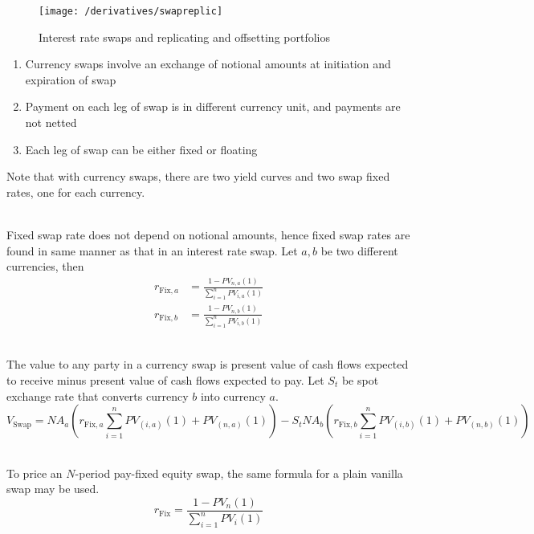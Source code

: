 \begin{figure}[H]
\centering
\texttt{[image: /derivatives/swapreplic]}
\caption{Interest rate swaps and replicating and offsetting portfolios}
\end{figure}

\begin{remark} 
\begin{enumerate}[label=\roman*.]
\setlength{\itemsep}{0pt}
\item Currency swaps involve an exchange of notional amounts at initiation and expiration of swap
\item Payment on each leg of swap is in different currency unit, and payments are not netted
\item Each leg of swap can be either fixed or floating
\end{enumerate}
Note that with currency swaps, there are two yield curves and two swap fixed rates, one for each currency.
\end{remark}

\begin{remark} \\
Fixed swap rate does not depend on notional amounts, hence fixed swap rates are found in same manner as that in an interest rate swap. Let $a,b$ be two different currencies, then
\begin{align}
r_{\text{Fix}, a} &= \frac{1 - PV_{n,a}(1)}{\sum\limits_{i=1}^n PV_{i,a}(1)} \nonumber \\
r_{\text{Fix}, b} &= \frac{1 - PV_{n,b}(1)}{\sum\limits_{i=1}^n PV_{i,b}(1)} \nonumber
\end{align}
\end{remark}

\begin{remark} \\
The value to any party in a currency swap is present value of cash flows expected to receive minus present value of cash flows expected to pay. Let $S_t$ be spot exchange rate that converts currency $b$ into currency $a$.
\begin{equation}
V_{\text{Swap}} = NA_a \left(r_{\text{Fix}, a} \sum\limits_{i=1}^n PV_{(i, a)}(1) + PV_{(n, a)}(1) \right) - S_t NA_b \left(r_{\text{Fix}, b} \sum\limits_{i=1}^n PV_{(i, b)}(1) + PV_{(n, b)}(1) \right) \nonumber
\end{equation}
\end{remark}

\begin{remark} \\
To price an $N$-period pay-fixed equity swap, the same formula for a plain vanilla swap may be used.
\begin{equation}
r_{\text{Fix}} = \frac{1 - PV_{n}(1)}{\sum\limits_{i=1}^n PV_{i}(1)} \nonumber
\end{equation}
\end{remark}

